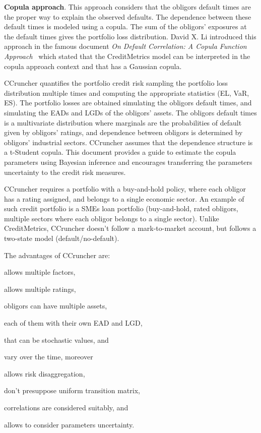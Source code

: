 \documentclass[11pt,fleqn]{book} %
\begin{document}
\textbf{Copula approach}. This approach considers that the obligors default 
times are the proper way to explain the observed defaults. The dependence 
between these default times is modeled using a copula. The sum of the 
obligors' exposures at the default times gives the portfolio loss distribution.
David X. Li introduced this approach in the famous document
\emph{On Default Correlation: A Copula Function Approach}~\cite{li:2000}
which stated that the CreditMetrics{\texttrademark} model can be interpreted 
in the copula approach context and that has a Gaussian copula.

CCruncher quantifies the portfolio credit risk sampling the portfolio loss
distribution multiple times and computing the appropriate statistics (EL, 
VaR, ES). The portfolio losses are obtained simulating the obligors default 
times, and simulating the EADs and LGDs of the obligors' assets. The obligors 
default times is a multivariate distribution where marginals are the 
probabilities of default given by obligors' ratings, and dependence between 
obligors is determined by obligors' industrial sectors.
CCruncher assumes that the dependence structure is a t-Student copula.
This document provides a guide to estimate the copula parameters using
Bayesian inference and encourages transferring the parameters uncertainty
to the credit risk measures.

CCruncher requires a portfolio with a buy-and-hold policy, where each obligor 
has a rating assigned, and belongs to a single economic sector.
An example of such credit portfolio is a SMEs loan portfolio (buy-and-hold, 
rated obligors, multiple sectors where each obligor belongs to a single sector). 
Unlike CreditMetrics{\texttrademark}, CCruncher doesn't follow a mark-to-market 
account, but follows a two-state model (default/no-default). 

The advantages of CCruncher are: 
\begin{inparaenum}[1)]
	\item allows multiple factors,
	\item allows multiple ratings,
	\item obligors can have multiple assets,
	\item each of them with their own EAD and LGD,
	\item that can be stochastic values, and
	\item vary over the time, moreover
	\item allows risk disaggregation,
	\item don't presuppose uniform transition matrix,
	\item correlations are considered suitably, and
	\item allows to consider parameters uncertainty.
\end{inparaenum}
\end{document}
